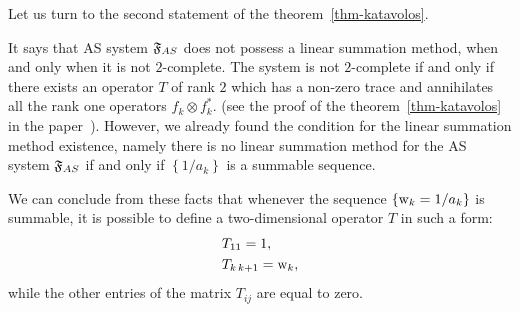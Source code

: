 \documentclass[12pt]{article}
\begin{document}
      Let us turn to the second statement of the theorem~\ref{thm-katavolos}.

      It says that AS system $\mathfrak{F}_{AS}$ does not possess a linear summation method,
        when and only when it is not $2$-complete.
      The system is not $2$-complete if and only if there exists an operator $T$ of rank $2$
        which has a non-zero trace and annihilates all the rank one operators $f_k \otimes f^*_k$.
        (see the proof of the theorem~\ref{thm-katavolos} in the paper~\cite{katavolos}).
      However, we already found the condition for the linear summation method existence, namely
        there is no linear summation method for the AS system $\mathfrak{F}_{AS}$ if and only if $\left\{1/a_k\right\}$
        is a summable sequence.
      \begin{remark}
        \label{as-rmk}
        We can conclude from these facts that whenever the sequence $\left\{\mathrm{w}_k = 1/a_k\right\}$ is summable,
          it is possible to define a two-dimensional operator $T$ in such a form:
          \begin{align*}
            &T_{11} = 1,\\
            &T_{k\, k+1} = \mathrm{w}_k,
          \end{align*}
        while the other entries of the matrix $T_{ij}$ are equal to zero.
      \end{remark}
      \pagebreak
\end{document}

